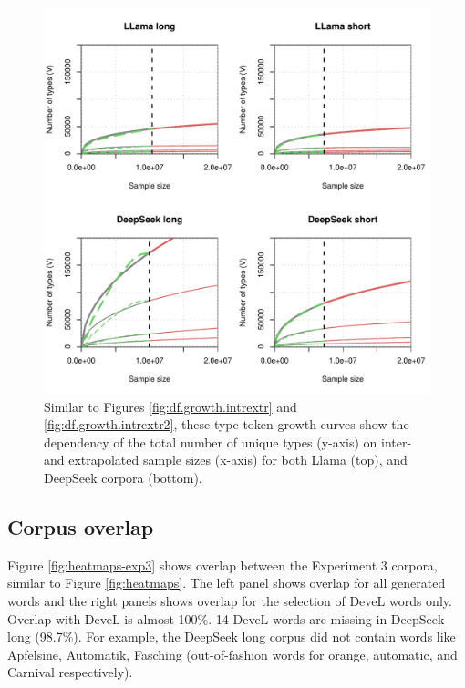 \documentclass[doc, a4paper, anonymous]{apa7}
\begin{document}
\begin{figure}[!htbp]
    \includegraphics[width = .8\paperwidth]{figures/vgc_plots_grid_exp3_20.pdf}
    \caption{Similar to Figures \ref{fig:df.growth.intrextr} and \ref{fig:df.growth.intrextr2}, these type-token growth curves show the dependency of the total number of unique types (y-axis) on inter- and extrapolated sample sizes (x-axis) for both Llama (top), and DeepSeek corpora (bottom).}
    \label{fig:df.growth.intrextr3}
  \hfill
\end{figure}

\clearpage  

\subsection{Corpus overlap}

Figure \ref{fig:heatmaps-exp3} shows overlap between the Experiment 3 corpora, similar to Figure \ref{fig:heatmaps}. The left panel shows overlap for all generated words and the right panels shows overlap for the selection of DeveL words only. Overlap with DeveL is almost 100\%. 14 DeveL words are missing in DeepSeek long (98.7\%). For example, the DeepSeek long corpus
did not contain words like Apfelsine, Automatik, Fasching (out-of-fashion words for orange, automatic, and Carnival respectively).
\end{document}
